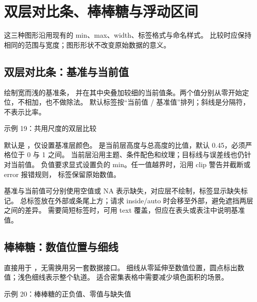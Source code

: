 \section{双层对比条、棒棒糖与浮动区间}
这三种图形沿用现有的 min、max、width、标签格式与命名样式。
比较时应保持相同的范围与宽度；图形形状不改变原始数据的意义。

\subsection{双层对比条：基准与当前值}
 绘制宽而浅的基准条，
并在其中央叠加较细的当前值条。两个值分别从零开始定位，不相加，也不做除法。
默认标签按“当前值 / 基准值”排列；斜线是分隔符，不表示比率。

\begin{example}[text and listing,sidebyside=false]{示例 19：共用尺度的双层比较}


\end{example}

 默认是 ，仅设置基准层颜色。
 是当前层高度与总高度的比值，默认 0.45，必须严格位于 0 与 1 之间。
当前层沿用主题、条件配色和纹理；目标线与误差线也仍针对当前值。
负值要求显式设置负的 min。任一值越界时，沿用 clip 警告并截断或 error 报错规则，
标签保留原始数值。

基准与当前值可分别使用空值或 NA 表示缺失，对应层不绘制，标签显示缺失标记。
总标签放在外部或条尾上方；请求 inside/auto 时会移至外部，避免遮挡两层之间的差异。
需要简短标签时，可用 text 覆盖，但应在表头或表注中说明基准值。

\clearpage
\subsection{棒棒糖：数值位置与细线}
 直接用于 \key{\gradbar}，无需换用另一套数据接口。
细线从零延伸至数值位置，圆点标出数值；浅色细线表示整个轨道。
适合密集表格中需要减少填色面积的场景。

\begin{example}[text and listing,sidebyside=false]{示例 20：棒棒糖的正负值、零值与缺失值}



\end{example}

